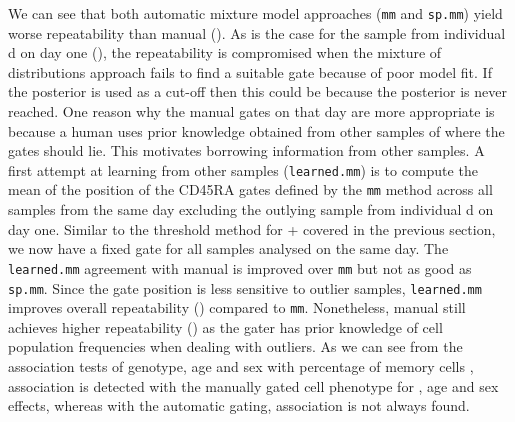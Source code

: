 We can see that both automatic mixture model approaches (\texttt{mm} and \texttt{sp.mm}) yield worse repeatability than manual ().
As is the case for the sample from individual d on day one (),
the repeatability is compromised when the mixture of distributions approach fails to find a suitable gate because of poor model fit.
If the posterior is used as a cut-off then this could be because the posterior is never reached.
One reason why the manual gates on that day are more appropriate is because a human uses prior knowledge obtained from other samples of where the gates should lie.
This motivates borrowing information from other samples.
A first attempt at learning from other samples (\texttt{learned.mm}) is to compute the mean of the position of the CD45RA gates defined by the \texttt{mm}
method across all samples from the same day excluding the outlying sample from individual d on day one.
Similar to the threshold method for + covered in the previous section, we now have a fixed gate for all samples analysed on the same day.
The \texttt{learned.mm} agreement with manual is improved over \texttt{mm} but not as good as \texttt{sp.mm}.
Since the gate position is less sensitive to outlier samples, \texttt{learned.mm} improves overall repeatability () compared to
\texttt{mm}.
Nonetheless, manual still achieves higher repeatability () as
the gater has prior knowledge of cell population frequencies when dealing with outliers.
As we can see from the association tests of genotype, age and sex with percentage of memory cells ,
association is detected with the manually gated cell phenotype for , age and sex effects,
whereas with the automatic gating, association is not always found.



